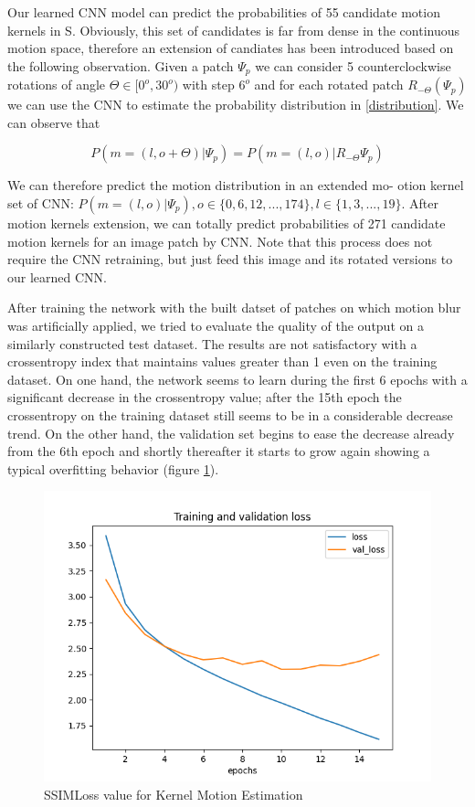 \documentclass[12pt,a4paper]{article}
\begin{document}
Our learned CNN model can predict the probabilities of 55 candidate motion kernels in S. Obviously, this set of candidates is far from dense in the continuous motion space, therefore an extension of candiates has been introduced based on the following observation. Given a patch $\Psi_p$ we can consider 5 counterclockwise rotations of angle $\Theta \in [0^o, 30^o)$ with step $6^o$ and for each rotated patch $R_{-\Theta}(\Psi_p)$ we can use the CNN to estimate the probability distribution in \ref{distribution}. We can observe that 

\begin{equation}
P(m = (l, o+\Theta)|\Psi_p) = P(m=(l,o)|R_{-\Theta}\Psi_p) 
\end{equation}

We can therefore predict the motion distribution in an extended mo-
otion kernel set of CNN: $P(m = (l, o)|\Psi_p), o \in \lbrace 0, 6, 12, ..., 174 \rbrace, l \in \lbrace 1, 3, ..., 19 \rbrace$.
After motion kernels extension, we can totally predict probabilities of 271 candidate motion kernels for an image patch by CNN. Note that this process does not require the CNN retraining, but just feed this image and its rotated versions to our learned CNN.

After training the network with the built datset of patches on which motion blur was artificially applied, we tried to evaluate the quality of the output on a similarly constructed test dataset. The results are not satisfactory with a crossentropy index that maintains values greater than 1 even on the training dataset. On one hand, the network seems to learn during the first 6 epochs with a significant decrease in the crossentropy value; after the 15th epoch the crossentropy on the training dataset still seems to be in a considerable decrease trend. On the other hand, the validation set begins to ease the decrease already from the 6th epoch and shortly thereafter it starts to grow again showing a typical overfitting behavior (figure \ref{motion_kernel_SSIM}).

\begin{figure}[hptb]
\centering
\includegraphics[scale=0.45]{KernelMotion_loss.png} 
\caption{SSIMLoss value for Kernel Motion Estimation}
\label{motion_kernel_SSIM}
\end{figure}
\end{document}
